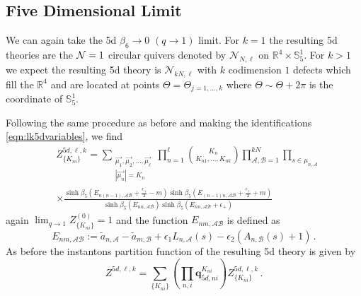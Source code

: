 \documentclass[main.tex]{subfiles}
\begin{document}
\subsection{Five Dimensional Limit}
We can again take the 5d $\beta_6\to0$ $(q\to1)$ limit. For $k=1$ the resulting 5d theories are the $\mathcal{N}=1$ circular quivers denoted by $\mathcal{N}_{N,\ell}$ on $\mathbb{R}^4\times \mathbb{S}^1_5$. For $k>1$ we expect the resulting 5d theory is $\mathcal{N}_{k N,\ell}$ with $k$ codimension $1$ defects which fill the $\mathbb{R}^4$ and are located at points $\Theta=\Theta_{j=1,\dots,k}$ where $\Theta\sim \Theta+2\pi$ is the coordinate of $\mathbb{S}_5^1$. 


Following the same procedure as before and making the identifications \eqref{eqn:lk5dvariables}, we find
\begin{equation}\label{eqn:lknm5dpartitionfunctionyng}
\begin{aligned}
&Z^{5d,\ell,k}_{\{K_{ni}\}}=\sum_{\substack{\vec{\mu_1},\vec{\mu_2},\dots,\vec{\mu_{\ell}}\\|\vec{\mu_n}|=K_n}}\prod_{n=1}^{\ell}\binom{K_n}{K_{n1},\dots,K_{nk}}\prod_{\mathcal{A},\mathcal{B}=1}^{kN}\prod_{s\in \mu_{n,\mathcal{A}}}\\
&\times\frac{\sinh\beta_5\left(E_{n(n-1),\mathcal{A}\mathcal{B}}+\frac{\epsilon_+}{2}-m\right)\sinh\beta_5\left(E_{(n-1)n,\mathcal{A}\mathcal{B}}+\frac{\epsilon_+}{2}+m\right)}{\sinh\beta_5\left(E_{nn,\mathcal{A}\mathcal{B}}\right)\sinh\beta_5\left(E_{nn,\mathcal{A}\mathcal{B}}+\epsilon_+\right)}
\end{aligned}
\end{equation}
again $\lim_{q\to1}Z^{(0)}_{\{K_{ni}\}}=1$ and the function $E_{nm,\mathcal{A}\mathcal{B}}$ is defined as
\begin{equation}
E_{nm,\mathcal{A}\mathcal{B}}:=\tilde{a}_{n,\mathcal{A}}-\tilde{a}_{m,\mathcal{B}}+\epsilon_1L_{n,\mathcal{A}}(s)-\epsilon_2\left(A_{n,\mathcal{B}}(s)+1\right)\,.
\end{equation}
As before the instantons partition function of the resulting 5d theory is given by
\begin{equation}
Z^{5d,\ell,k}=\sum_{\{K_{ni}\}}\left(\prod_{n,i}\mathbf{q}_{5d,ni}^{K_{ni}}\right)Z^{5d,\ell,k}_{\{K_{ni}\}}
\,.
\end{equation}
\end{document}
